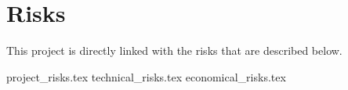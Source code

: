 \section{Risks} %
\label{sec:Risks}

This project is directly linked with the risks that are described below.

{project_risks.tex}
{technical_risks.tex}
{economical_risks.tex}



